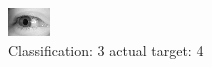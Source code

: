 \begin{figure}[h!]
\begin{center}
\includegraphics[width=0.60\columnwidth]{figures/ID3114_class_3_target_4.png}
\end{center}
\caption{ Classification: 3 actual target: 4}
\label{fig:ID3114_class_3_target_4}
\end{figure}
